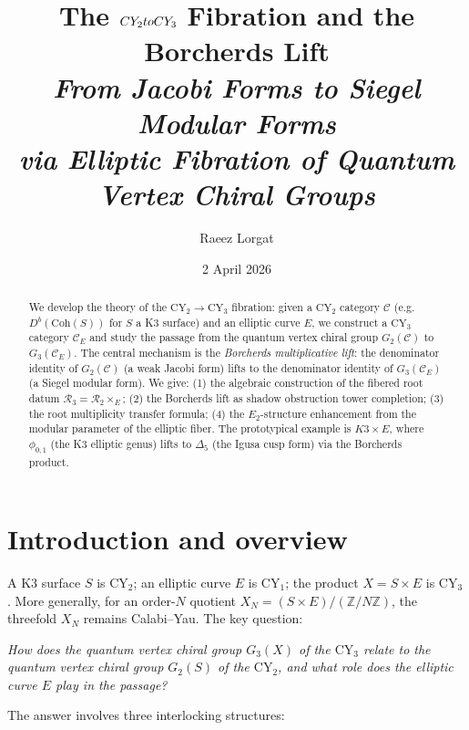 \documentclass[11pt]{article}
\title{The $\CY_2 \to \CY_3$ Fibration and the Borcherds Lift\\[6pt]
\large\itshape From Jacobi Forms to Siegel Modular Forms\\
via Elliptic Fibration of Quantum Vertex Chiral Groups}
\author{Raeez Lorgat}
\date{2 April 2026}
\theoremstyle{plain}
\theoremstyle{definition}
\theoremstyle{remark}
\newcommand{\CY}{\mathrm{CY}}
\newcommand{\Coh}{\mathrm{Coh}}
\newcommand{\Etwo}{E_2}
\newcommand{\cC}{\mathcal{C}}
\newcommand{\cR}{\mathcal{R}}
\begin{document}
\maketitle

\begin{abstract}
We develop the theory of the $\CY_2 \to \CY_3$ fibration: given a $\CY_2$
category $\cC$ (e.g.\ $D^b(\Coh(S))$ for $S$ a K3 surface) and an elliptic
curve $E$, we construct a $\CY_3$ category $\cC_E$ and study the passage from
the quantum vertex chiral group $G_2(\cC)$ to $G_3(\cC_E)$. The central
mechanism is the \emph{Borcherds multiplicative lift}: the denominator identity
of $G_2(\cC)$ (a weak Jacobi form) lifts to the denominator identity of
$G_3(\cC_E)$ (a Siegel modular form). We give: (1) the algebraic construction
of the fibered root datum $\cR_3 = \cR_2 \times_E$; (2) the Borcherds lift as
shadow obstruction tower completion; (3) the root multiplicity transfer formula; (4) the
$\Etwo$-structure enhancement from the modular parameter of the elliptic fiber.
The prototypical example is $K3 \times E$, where $\phi_{0,1}$ (the K3 elliptic
genus) lifts to $\Delta_5$ (the Igusa cusp form) via the Borcherds product.
\end{abstract}

\tableofcontents

\section{Introduction and overview}
\label{sec:fib-intro}

A K3 surface $S$ is $\CY_2$; an elliptic curve $E$ is $\CY_1$; the product
$X = S \times E$ is $\CY_3$. More generally, for an order-$N$ quotient
$X_N = (S \times E)/(\mathbb{Z}/N\mathbb{Z})$, the threefold $X_N$ remains
Calabi--Yau. The key question:

\medskip
\noindent\textit{How does the quantum vertex chiral group $G_3(X)$ of the $\CY_3$
relate to the quantum vertex chiral group $G_2(S)$ of the $\CY_2$, and what
role does the elliptic curve $E$ play in the passage?}
\medskip

The answer involves three interlocking structures:
\end{document}
